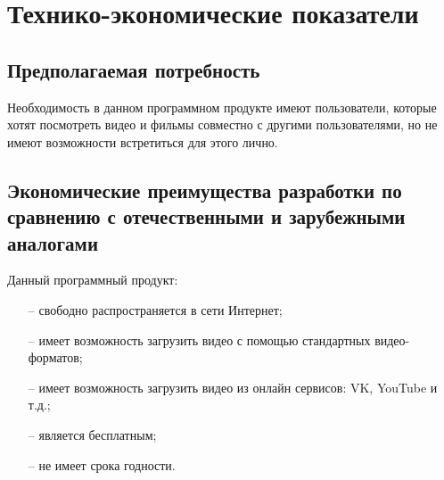 \section{Технико-экономические показатели}

\subsection{Предполагаемая потребность}

Необходимость в данном программном продукте имеют пользователи, которые хотят посмотреть видео и фильмы совместно с другими пользователями, но не имеют возможности встретиться для этого лично.

\subsection{Экономические преимущества разработки по сравнению с отечественными и зарубежными аналогами}

Данный программный продукт:
\begin{itemize}
    \item[--] свободно распространяется в сети Интернет;
    \item[--] имеет возможность загрузить видео с помощью стандартных видео-форматов;
    \item[--] имеет возможность загрузить видео из онлайн сервисов: VK, YouTube и т.д.;
    \item[--] является бесплатным;
    \item[--] не имеет срока годности.
\end{itemize}